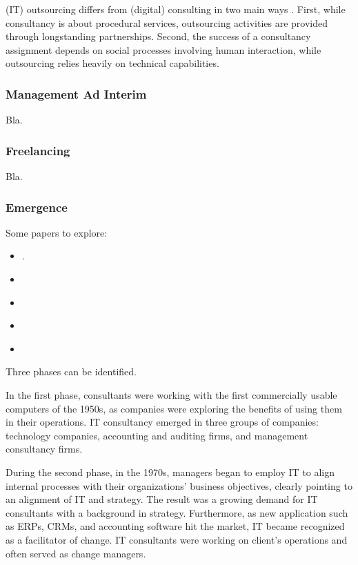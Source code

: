 \documentclass[12pt]{article}
\providecommand{\tightlist}{%
  \setlength{\itemsep}{0pt}\setlength{\parskip}{0pt}}
\begin{document}
(IT) outsourcing differs from (digital) consulting in two main ways
\citep[ 171-173]{kipping2012}. First, while consultancy is about
procedural services, outsourcing activities are provided through
longstanding partnerships. Second, the success of a consultancy
assignment depends on social processes involving human interaction,
while outsourcing relies heavily on technical capabilities.

\hypertarget{management-ad-interim}{%
\subsubsection{Management Ad Interim}\label{management-ad-interim}}

Bla.

\hypertarget{freelancing}{%
\subsubsection{Freelancing}\label{freelancing}}

Bla.

\hypertarget{emergence}{%
\subsubsection{Emergence}\label{emergence}}

Some papers to explore:

\begin{itemize}
\tightlist
\item
  \citep[ 120-130]{armbruster2006}.
\item
  \citep{kipping2003}
\item
  \citep{kipping2012}
\item
  \citep[ 336]{fincham1999}
\item
  \citep{mckenna2006}
\end{itemize}

Three phases can be identified.

In the first phase, consultants were working with the first commercially
usable computers of the 1950s, as companies were exploring the benefits
of using them in their operations. IT consultancy emerged in three
groups of companies: technology companies, accounting and auditing
firms, and management consultancy firms. \citep[ 162]{kipping2012}

During the second phase, in the 1970s, managers began to employ IT to
align internal processes with their organizations' business objectives,
clearly pointing to an alignment of IT and strategy. The result was a
growing demand for IT consultants with a background in strategy.
Furthermore, as new application such as ERPs, CRMs, and accounting
software hit the market, IT became recognized as a facilitator of
change. IT consultants were working on client's operations and often
served as change managers.
\end{document}
